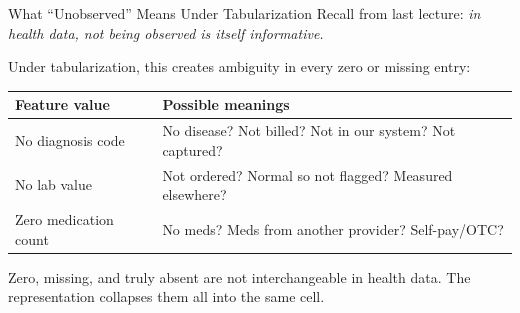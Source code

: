 \documentclass[aspectratio=169,10pt]{beamer}
\begin{document}
\begin{frame}{What ``Unobserved'' Means Under Tabularization}
Recall from last lecture: \emph{in health data, not being observed is itself informative.}
\vspace{0.2em}

Under tabularization, this creates ambiguity in every zero or missing entry:
\vspace{0.2em}
\begin{center}
{\small
\begin{tabular}{lp{8.5cm}}
\toprule
\textbf{Feature value} & \textbf{Possible meanings} \\
\midrule
No diagnosis code & No disease? Not billed? Not in our system? Not captured? \\
No lab value & Not ordered? Normal so not flagged? Measured elsewhere? \\
Zero medication count & No meds? Meds from another provider? Self-pay/OTC? \\
\bottomrule
\end{tabular}
}
\end{center}
\vspace{0.2em}
\alert{Zero, missing, and truly absent are not interchangeable in health data.} The representation collapses them all into the same cell.
\end{frame}

\end{document}
